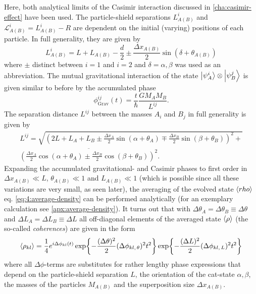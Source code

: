 Here, both analytical limits of the Casimir interaction discussed in \cref{cha:casimir-effect} have been used.
The particle-shield separations $L^i_{A(B)}$ and $\mathscr{L}^i_{A(B)} = L^i_{A(B)}-R$ are dependent on the initial (varying) positions of each particle.
In full generality, they are given by
\begin{equation}\label{eq:4:L-casimir}
  L^i_{A(B)} = L + L_{A(B)} - \frac{d}{2} \pm \frac{\Delta x_{A(B)}}{2} \sin(\delta + \theta_{A(B)})
\end{equation}
where $\pm$ distinct between $i=1$ and $i=2$ and $\delta = \alpha, \beta$ was used as an abbreviation.
The mutual gravitational interaction of the state $\ket{\psi^i_A}\otimes\ket{\psi^j_B}$ is given similar to before by the accumulated phase
\begin{equation}
  \phi^{ij}_\mathrm{Grav}(t) = \frac{t}{\hbar} \frac{G M_A M_B}{L^{ij}} .
\end{equation}
The separation distance $L^{ij}$ between the masses $A_i$ and $B_j$ in full generality is given by
\begin{multline}\label{eq:4:L-gravity}
  L^{ij} = \sqrt{\left(2L + L_A + L_B \pm \frac{\Delta x_A}{2}\sin(\alpha + \theta_A) \mp \frac{\Delta x_B}{2}\sin(\beta + \theta_B)\right)^2 +} \\ \overline{\left(\frac{\Delta x_A}{2}\cos(\alpha + \theta_A) \pm \frac{\Delta x_B}{2}\cos(\beta + \theta_B)\right)^2} .
\end{multline}
Expanding the accumulated gravitational- and Casimir phases to first order in $\Delta x_{A(B)} \ll L$, $\theta_{A(B)} \ll 1$ and $L_{A(B)} \ll 1$ (which is possible since all these variations are very small, as seen later), the averaging of the evolved state $\left\langle rho\right\rangle$ eq. \eqref{eq:4:average-density} can be performed analytically (for an exemplary calculation see \cref{apx:average-density}).
It turns out that with $\Delta \theta_A = \Delta \theta_B \equiv \Delta\theta$ and $\Delta L_A = \Delta L_B \equiv \Delta L$ all off-diagonal elements of the averaged state $\left\langle\rho\right\rangle$ (the so-called \emph{coherences}) are given in the form
\begin{equation}\label{eq:4:average-density-element}
  \left\langle\rho_{kl}\right\rangle = \frac{1}{4} e^{i \Delta \phi_{kl}(t)} \exp{-\frac{(\Delta\theta)^2}{2} (\Delta\phi_{kl,\,\theta})^2 t^2} \exp{-\frac{(\Delta L)^2}{2} (\Delta\phi_{kl,\,L})^2 t^2}
\end{equation}
where all $\Delta \phi$-terms are substitutes for rather lengthy phase expressions that depend on the particle-shield separation $L$, the orientation of the cat-state $\alpha, \beta$, the masses of the particles $M_{A(B)}$ and the superposition size $\Delta x_{A(B)}$.
